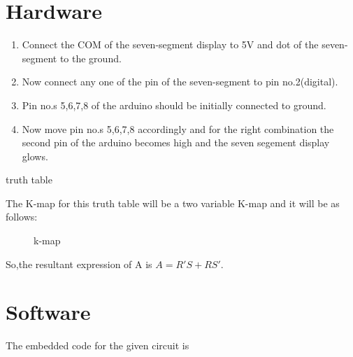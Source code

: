 \documentclass[12pt]{article}
\begin{document}
\section{Hardware}
	\begin{enumerate}
\item Connect the COM of the seven-segment display to 5V and dot of the seven-segment to the ground.
\item Now connect any one of the pin of the seven-segment to pin no.2(digital).
\item Pin no.s 5,6,7,8 of the arduino should be initially connected to ground.
\item Now move pin no.s 5,6,7,8 accordingly and for the right combination the second pin of the arduino becomes high and the seven segement display glows.
\end{enumerate}
\begin{table}[h]
\begin{center}
	
\end{center}
\caption{truth table}
\label{table 2}
\end{table}
The K-map for this truth table will be a two variable K-map and it will be as follows:
\begin{figure}[h]
	
\caption{k-map}
\label{fig2}
\end{figure}

So,the resultant expression of A is $A = R'S + RS'$.
\pagebreak
\section{Software}

The embedded code for the given circuit is \\

\end{document}
